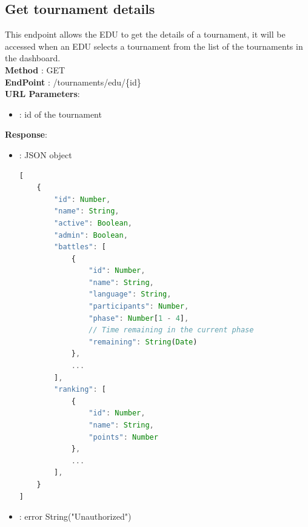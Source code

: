\subsection*{Get tournament details}
This endpoint allows the EDU to get the details of a tournament, it will be accessed when an EDU selects a tournament from the list of the tournaments in the dashboard.\\
\textbf{Method} : GET \\
\textbf{EndPoint} : /tournaments/edu/\{id\} \\
\textbf{URL Parameters}:
\begin{itemize}
    \item {} : id of the tournament
\end{itemize}
\textbf{Response}:
\begin{itemize}
    \item {} : JSON object
          \begin{lstlisting}[language=JavaScript, label={lst:jscode}, basicstyle=\ttfamily]
[
    {
        "id": Number,
        "name": String,
        "active": Boolean,
        "admin": Boolean,
        "battles": [
            {
                "id": Number,
                "name": String,
                "language": String,
                "participants": Number,
                "phase": Number[1 - 4],
                // Time remaining in the current phase
                "remaining": String(Date)
            },
            ...
        ],
        "ranking": [
            {
                "id": Number,
                "name": String,
                "points": Number
            },
            ...
        ],
    }
]
            \end{lstlisting}
    \item {} : error String("Unauthorized")
\end{itemize}

